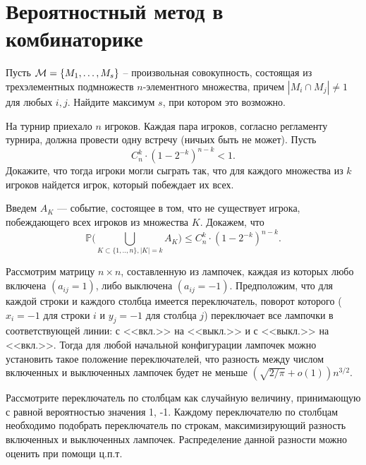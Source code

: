 \section{Вероятностный метод в комбинаторике}

\begin{problem}
 Пусть $ {\cal M} = \{M_1, \dots, M_s\} $ -- 
произвольная совокупность, состоящая из трехэлементных подмножеств 
$ n $-элементного множества, причем $ |M_i \cap M_j| \neq 1 $ для любых 
$ i, j $. Найдите максимум $ s $, при котором это возможно. 
\end{problem}

\begin{problem}
На турнир приехало $n$ игроков. Каждая пара игроков, согласно регламенту турнира, должна провести одну встречу (ничьих быть не может). Пусть 
$$
C_n^k\cdot (1-2^{-k})^{n-k}<1 . 
$$
Докажите, что тогда игроки могли сыграть так, что для каждого множества из $k$ игроков найдется игрок, который побеждает их всех. 

\end{problem}

\begin{ordre}
Введем $A_K$ --- событие, состоящее в том, что не существует игрока, побеждающего всех игроков из множества $K$. 
Докажем, что 
$$
{\mathbb P}\bigl(\bigcup\limits_{K\subset\{1,..,n\},|K|=k} A_K \bigr)\leqslant C_n^k\cdot (1-2^{-k})^{n-k} . 
$$

\end{ordre}


\begin{problem}
Рассмотрим матрицу $n\times n$, составленную из лампочек, каждая из которых любо включена $(a_{ij}=1)$, либо выключена $(a_{ij}=-1)$. 
Предположим, что для каждой строки и каждого столбца имеется переключатель, поворот которого ($x_i=-1$ для строки $i$ и 
$y_j=-1$ для столбца $j$) переключает все лампочки в соответствующей линии: с <<вкл.>> на <<выкл.>> и с <<выкл.>> на <<вкл.>>. 
Тогда для любой начальной конфигурации лампочек можно установить такое положение переключателей, что разность между числом включенных и 
выключенных лампочек будет не меньше $(\sqrt{2/\pi}+o(1))n^{3/2}$. 
\end{problem}

\begin{ordre}
Рассмотрите  переключатель по столбцам как случайную величину, принимающую с равной вероятностью значения 1, -1. Каждому переключателю по столбцам необходимо подобрать переключатель по строкам, максимизирующий разность включенных и 
выключенных лампочек. Распределение данной разности можно оценить при помощи ц.п.т.       
\end{ordre}



